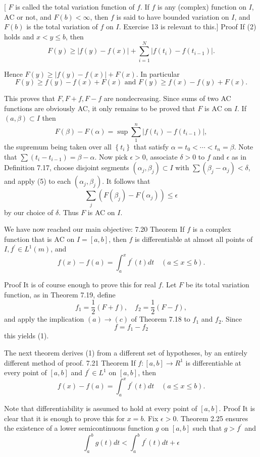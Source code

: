 [ $F$ is called the total variation function of $f$. If $f$ is any (complex) function on $I$, $\mathrm{AC}$ or not, and $F(b)<\infty$, then $f$ is said to have bounded variation on $I$, and $F(b)$ is the total variation of $f$ on $I$. Exercise 13 is relevant to this.]
Proof If (2) holds and $x<y \leq b$, then
$$
F(y) \geq|f(y)-f(x)|+\sum_{i=1}^N\left|f\left(t_i\right)-f\left(t_{i-1}\right)\right| .
$$

Hence $F(y) \geq|f(y)-f(x)|+F(x)$. In particular
$$
F(y) \geq f(y)-f(x)+F(x) \text { and } F(y) \geq f(x)-f(y)+F(x) .
$$

This proves that $F, F+f, F-f$ are nondecreasing.
Since sums of two AC functions are obviously AC, it only remains to be proved that $F$ is $\mathrm{AC}$ on $I$.
If $(a, \beta) \subset I$ then
$$
F(\beta)-F(\alpha)=\sup \sum_1^n\left|f\left(t_i\right)-f\left(t_{i-1}\right)\right|,
$$
the supremum being taken over all $\left\{t_i\right\}$ that satisfy $\alpha=t_0<\cdots<t_n=\beta$.
Note that $\sum\left(t_i-t_{i-1}\right)=\beta-\alpha$.
Now pick $\epsilon>0$, associate $\delta>0$ to $f$ and $\epsilon$ as in Definition 7.17, choose disjoint segments $\left(\alpha_j, \beta_j\right) \subset I$ with $\sum\left(\beta_j-\alpha_j\right)<\delta$, and apply (5) to each $\left(\alpha_j, \beta_j\right)$. It follows that
$$
\sum_j\left(F\left(\beta_j\right)-F\left(\alpha_j\right)\right) \leq \epsilon
$$
by our choice of $\delta$. Thus $F$ is AC on $I$.

We have now reached our main objective:
7.20 Theorem If $f$ is a complex function that is $\mathrm{AC}$ on $I=[a, b]$, then $f$ is differentiable at almost all points of $I, f^{\prime} \in L^1(m)$, and
$$
f(x)-f(a)=\int_a^x f^{\prime}(t) d t \quad(a \leq x \leq b) .
$$

Proof It is of course enough to prove this for real $f$. Let $F$ be its total variation function, as in Theorem 7.19, define
$$
f_1=\frac{1}{2}(F+f), \quad f_2=\frac{1}{2}(F-f),
$$
and apply the implication $(a) \rightarrow(c)$ of Theorem 7.18 to $f_1$ and $f_2$. Since
$$
f=f_1-f_2
$$
this yields (1).


The next theorem derives (1) from a different set of hypotheses, by an entirely different method of proof.
7.21 Theorem If $f:[a, b] \rightarrow R^1$ is differentiable at every point of $[a, b]$ and $f^{\prime} \in L^1$ on $[a, b]$, then
$$
f(x)-f(a)=\int_a^x f^{\prime}(t) d t \quad(a \leq x \leq b) .
$$

Note that differentiability is assumed to hold at every point of $[a, b]$.
Proof It is clear that it is enough to prove this for $x=b$. Fix $\epsilon>0$. Theorem 2.25 ensures the existence of a lower semicontinuous function $g$ on $[a, b]$ such that $g>f^{\prime}$ and
$$
\int_a^b g(t) d t<\int_a^b f^{\prime}(t) d t+\epsilon
$$

